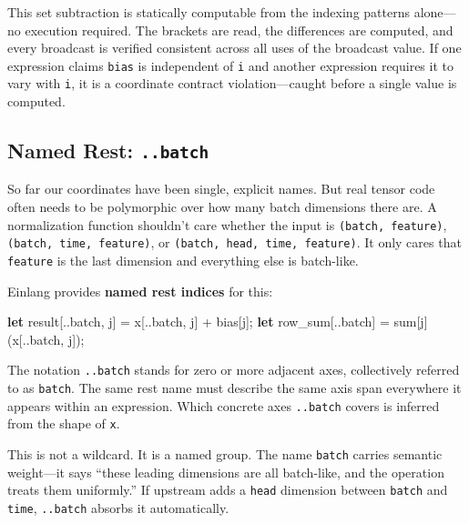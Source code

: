 \documentclass[11pt,titlepage]{article}
\newenvironment{Shaded}{}{}
\newcommand{\KeywordTok}[1]{\textcolor[rgb]{0.00,0.44,0.13}{\textbf{#1}}}
\newcommand{\NormalTok}[1]{#1}
\newcommand{\OperatorTok}[1]{\textcolor[rgb]{0.40,0.40,0.40}{#1}}
\begin{document}
This set subtraction is statically computable from the indexing patterns
alone---no execution required. The brackets are read, the differences
are computed, and every broadcast is verified consistent across all uses
of the broadcast value. If one expression claims \texttt{bias} is
independent of \texttt{i} and another expression requires it to vary
with \texttt{i}, it is a coordinate contract violation---caught before a
single value is computed.

\vspace{2em}

\hypertarget{named-rest-..batch}{%
\subsection{\texorpdfstring{Named Rest:
\texttt{..batch}}{Named Rest: ..batch}}\label{named-rest-..batch}}

So far our coordinates have been single, explicit names. But real tensor
code often needs to be polymorphic over how many batch dimensions there
are. A normalization function shouldn't care whether the input is
\texttt{(batch,\ feature)}, \texttt{(batch,\ time,\ feature)}, or
\texttt{(batch,\ head,\ time,\ feature)}. It only cares that
\texttt{feature} is the last dimension and everything else is
batch-like.

Einlang provides \textbf{named rest indices} for this:

\begin{Shaded}
\begin{Highlighting}[]
\KeywordTok{let}\NormalTok{ result}\OperatorTok{[}\NormalTok{..batch, j}\OperatorTok{]}\NormalTok{ = x}\OperatorTok{[}\NormalTok{..batch, j}\OperatorTok{]}\NormalTok{ + bias}\OperatorTok{[}\NormalTok{j}\OperatorTok{]}\NormalTok{;}
\KeywordTok{let}\NormalTok{ row_sum}\OperatorTok{[}\NormalTok{..batch}\OperatorTok{]}\NormalTok{ = sum}\OperatorTok{[}\NormalTok{j}\OperatorTok{]}\NormalTok{(x}\OperatorTok{[}\NormalTok{..batch, j}\OperatorTok{]}\NormalTok{);}
\end{Highlighting}
\end{Shaded}

The notation \texttt{..batch} stands for zero or more adjacent axes,
collectively referred to as \texttt{batch}. The same rest name must
describe the same axis span everywhere it appears within an expression.
Which concrete axes \texttt{..batch} covers is inferred from the shape
of \texttt{x}.

This is not a wildcard. It is a named group. The name \texttt{batch}
carries semantic weight---it says ``these leading dimensions are all
batch-like, and the operation treats them uniformly.'' If upstream adds
a \texttt{head} dimension between \texttt{batch} and \texttt{time},
\texttt{..batch} absorbs it automatically.
\end{document}
